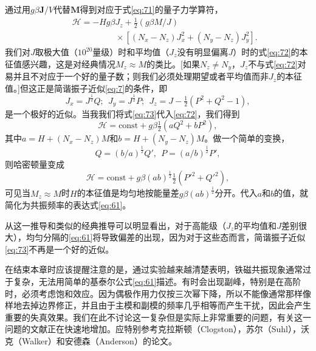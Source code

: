 \documentclass{article}
\begin{document}
通过用$g\beta\mathbf{J}/V$代替$\mathbf{M}$得到对应于式\eqref{eq:71}的量子力学算符，
\begin{eqnarray} \label{eq:72}
&&\mathcal{H}=-Hg\beta J_z+\tfrac{1}{2}(g\beta M/J)\nonumber\\
&&\phantom{~~~~~~~~~~~~~~~~~~~~~~~}\times[(N_x-N_z)J_x^2+(N_y-N_z)J_y^2].
\end{eqnarray}
我们对$J$取极大值（$10^{20}量级$）时和平均值（$J_z$没有明显偏离$J$）时的式\eqref{eq:72}的本征值感兴趣，这是对经典情况$M_z\approx M$的类比。[如果$N_z\neq N_y$，$J_z$不与式\eqref{eq:72}对易并且不对应于一个好的量子数；则我们必须处理期望或者平均值而非$J_z$的本征值。]但这正是简谐振子近似\eqref{eq:7}的条件，即
\begin{equation} \label{eq:73}
J_x=J^{\frac{1}{2}}Q;~~J_y=J^{\frac{1}{2}}P;~~J_z=J-\tfrac{1}{2}(P^2+Q^2-1),
\end{equation}
是一个极好的近似。当我我们将式\eqref{eq:73}代入\eqref{eq:72}，我们得到
\begin{equation} \label{eq:74}
\mathcal{H}=\text{const}+g\beta\tfrac{1}{2}(aQ^2+bP^2),
\end{equation}
其中$a=H+(N_x-N_z)M$和$b=H+(N_y-N_z)M$。做一个简单的变换，
\begin{equation} \label{eq:75}
Q=(b/a)^{\frac{1}{2}}Q',~~P=(a/b)^{\frac{1}{2}}P',
\end{equation}
则哈密顿量变成
\begin{equation} \label{eq:76}
\mathcal{H}=\text{const}+g\beta(ab)^{\frac{1}{2}}\tfrac{1}{2}(P'^2+Q'^2),
\end{equation}
可见当$M_z\approx M$时$H$的本征值是均匀地按能量差$g\beta(ab)^\frac{1}{2}$分开。代入$a$和$b$的值，就简化为共振频率的表达式\eqref{eq:61}。

从这一推导和类似的经典推导可以明显看出，对于高能级（$J_z$的平均值和$J$差别很大），均匀分隔的\eqref{eq:61}将导致偏差的出现，因为对于这些态而言，简谐振子近似\eqref{eq:73}不再是一个好的近似。

在结束本章时应该提醒注意的是，通过实验越来越清楚表明，铁磁共振现象通常过于复杂，无法用简单的基泰尔公式\eqref{eq:61}描述。有时会出现副峰，特别是在高阶时，必须考虑饱和效应。因为偶极作用力仅按三次幂下降，所以不能像通常那样像样地去掉边界修正，并且由于主模和副模的频率几乎相等而产生干扰，因此会产生重要的失真效果。我们在此不讨论这一复杂但是实际上非常重要的问题，有关这一问题的文献正在快速地增加。应特别参考克拉斯顿（Clogston），苏尔（Suhl），沃克（Walker）和安德森（Anderson）的论文。

\end{document}
